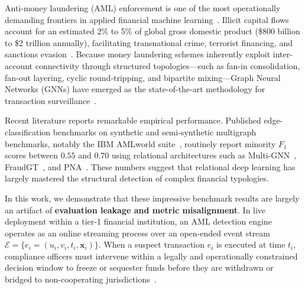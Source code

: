 \documentclass[10pt,twocolumn,letterpaper]{article}
\begin{document}
Anti-money laundering (AML) enforcement is one of the most operationally demanding frontiers in applied financial machine learning~\cite{weber2019elliptic,altman2023ibmaml,chainalysis2026crime}. Illicit capital flows account for an estimated 2\% to 5\% of global gross domestic product (\$800 billion to \$2 trillion annually), facilitating transnational crime, terrorist financing, and sanctions evasion~\cite{chainalysis2026crime}. Because money laundering schemes inherently exploit inter-account connectivity through structured topologies—such as fan-in consolidation, fan-out layering, cyclic round-tripping, and bipartite mixing—Graph Neural Networks (GNNs) have emerged as the state-of-the-art methodology for transaction surveillance~\cite{egressy2024multigraph,lin2024fraudgt,bilgi2026mega,ding2024diam}.

Recent literature reports remarkable empirical performance. Published edge-classification benchmarks on synthetic and semi-synthetic multigraph benchmarks, notably the IBM AMLworld suite~\cite{altman2023ibmaml}, routinely report minority $F_1$ scores between $0.55$ and $0.70$ using relational architectures such as Multi-GNN~\cite{egressy2024multigraph}, FraudGT~\cite{lin2024fraudgt}, and PNA~\cite{egressy2024multigraph}. These numbers suggest that relational deep learning has largely mastered the structural detection of complex financial typologies.

In this work, we demonstrate that these impressive benchmark results are largely an artifact of \textbf{evaluation leakage and metric misalignment}. In live deployment within a tier-1 financial institution, an AML detection engine operates as an online streaming process over an open-ended event stream $\mathcal{E}=\{e_i=(u_i,v_i,t_i,\mathbf{x}_i)\}$. When a suspect transaction $e_i$ is executed at time $t_i$, compliance officers must intervene within a legally and operationally constrained decision window to freeze or sequester funds before they are withdrawn or bridged to non-cooperating jurisdictions~\cite{eu2024instant,maganti2026liability}. 
\end{document}
